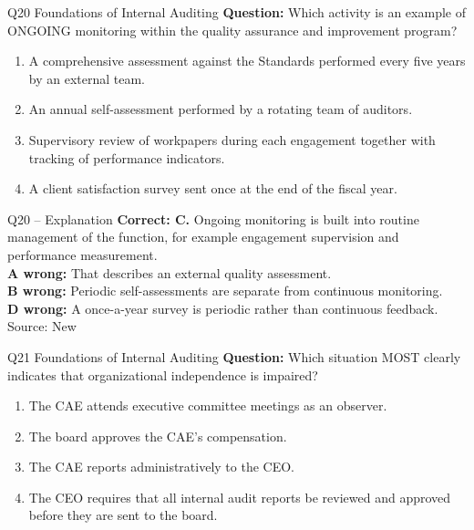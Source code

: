 \documentclass[aspectratio=169,10pt]{beamer}
\begin{document}
\begin{frame}[t]{Q20 \hfill {\scriptsize Foundations of Internal Auditing}}
	\small
	\textbf{Question:} Which activity is an example of ONGOING monitoring within the quality assurance and improvement program?
	\begin{enumerate}[label=\Alph*.,itemsep=1pt,topsep=3pt]
			\item A comprehensive assessment against the Standards performed every five years by an external team.
			\item An annual self-assessment performed by a rotating team of auditors.
			\item Supervisory review of workpapers during each engagement together with tracking of performance indicators.
			\item A client satisfaction survey sent once at the end of the fiscal year.
	\end{enumerate}
\end{frame}

\begin{frame}[t]{Q20 -- Explanation}
	\footnotesize
	\textbf{Correct: C.} Ongoing monitoring is built into routine management of the function, for example engagement supervision and performance measurement. \\[5pt]
\textbf{A wrong:} That describes an external quality assessment. \\[3pt]
\textbf{B wrong:} Periodic self-assessments are separate from continuous monitoring. \\[3pt]
\textbf{D wrong:} A once-a-year survey is periodic rather than continuous feedback. \\[3pt]
	\vfill {\tiny Source: New}
\end{frame}

\begin{frame}[t]{Q21 \hfill {\scriptsize Foundations of Internal Auditing}}
	\small
	\textbf{Question:} Which situation MOST clearly indicates that organizational independence is impaired?
	\begin{enumerate}[label=\Alph*.,itemsep=1pt,topsep=3pt]
			\item The CAE attends executive committee meetings as an observer.
			\item The board approves the CAE's compensation.
			\item The CAE reports administratively to the CEO.
			\item The CEO requires that all internal audit reports be reviewed and approved before they are sent to the board.
	\end{enumerate}
\end{frame}
\end{document}
